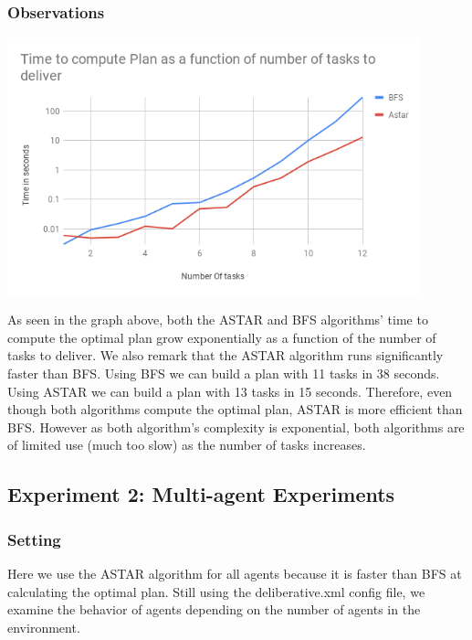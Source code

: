 \documentclass[11pt]{article}
\begin{document}
\subsubsection{Observations}
\begin{center}
\includegraphics[width=12cm]{time.png}
\end{center}
As seen in the graph above, both the ASTAR and BFS algorithms' time to compute the optimal plan grow exponentially as a function of the number of tasks to deliver. We also remark that the ASTAR algorithm runs significantly faster than BFS. Using BFS we can build a plan with 11 tasks in 38 seconds. Using ASTAR we can build a plan with 13 tasks in 15 seconds. Therefore, even though both algorithms compute the optimal plan, ASTAR is more efficient than BFS. However as both algorithm's complexity is exponential, both algorithms are of limited use (much too slow) as the number of tasks increases.

\subsection{Experiment 2: Multi-agent Experiments}

\subsubsection{Setting}
Here we use the ASTAR algorithm for all agents because it is faster than BFS at calculating the optimal plan. Still using the deliberative.xml config file, we examine the behavior of agents depending on the number of agents in the environment.
\end{document}
